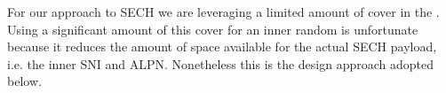 


For our approach to \ac{SECH} we are leveraging a limited amount of cover in the .
Using a significant amount of this cover for an inner random is unfortunate because it reduces
the amount of space available for the actual \ac{SECH} payload, i.e. the inner \ac{SNI} and \ac{ALPN}.
Nonetheless this is the design approach adopted below.

